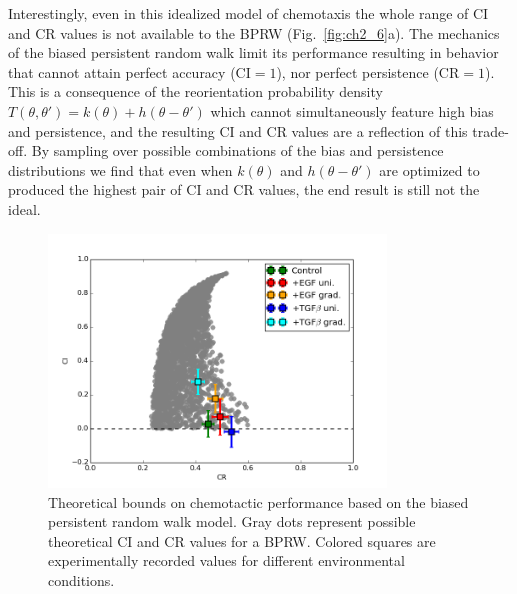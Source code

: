 Interestingly, even in this idealized model of chemotaxis the whole range of CI and CR values is not available to the BPRW (Fig.\ \ref{fig:ch2_6}a). The mechanics of the biased persistent random walk limit its performance resulting in behavior that cannot attain perfect accuracy ($\text{CI}=1$), nor perfect persistence ($\text{CR}=1$). This is a consequence of the reorientation probability density $T(\theta,\theta') = k(\theta) + h(\theta-\theta')$ which cannot simultaneously feature high bias and persistence, and the resulting CI and CR values are a reflection of this trade-off. By sampling over possible combinations of the bias and persistence distributions we find that even when $k(\theta)$ and $h(\theta-\theta')$ are optimized to produced the highest pair of CI and CR values, the end result is still not the ideal.

\begin{figure}
    \centering
    \includegraphics[width=0.80\textwidth]{../fig/ch2_fig4.png}
    \caption{Theoretical bounds on chemotactic performance based on the biased persistent random walk model. Gray dots represent possible theoretical CI and CR values for a BPRW. Colored squares are experimentally recorded values for different environmental conditions.} \label{fig:ch2_4}
\end{figure}

